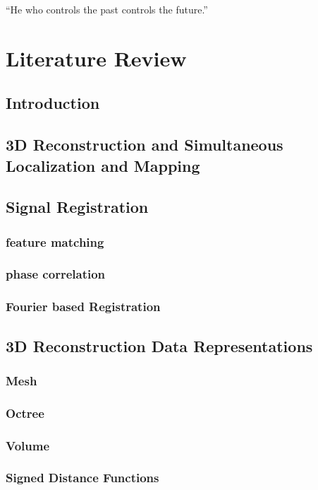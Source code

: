 \begin{savequote}[8cm]
  ``He who controls the past controls the future.''
\end{savequote}
\makeatletter
\chapter{Literature Review}

\section{Introduction}

\section{3D Reconstruction and Simultaneous Localization and Mapping}

\section{Signal Registration}

\subsection{feature matching}
\subsection{phase correlation}
\subsection{Fourier based Registration}

\section{3D Reconstruction Data Representations}

\subsection{Mesh}
\subsection{Octree}
\subsection{Volume}
\subsection{Signed Distance Functions}


